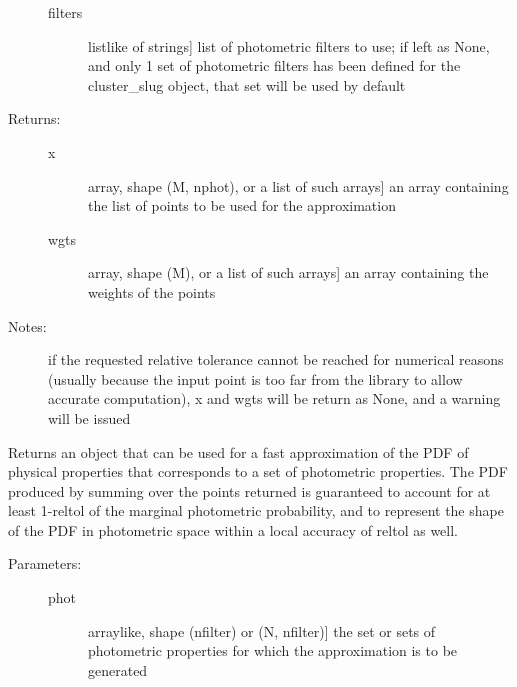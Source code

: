 \documentclass[letterpaper,10pt,english]{sphinxmanual}
\begin{document}
\begin{fulllineitems}
\begin{fulllineitems}
\begin{description}
\begin{description}
\item[{filters}] \leavevmode{[}listlike of strings{]}
list of photometric filters to use; if left as None, and
only 1 set of photometric filters has been defined for
the cluster\_slug object, that set will be used by
default

\end{description}

\item[{Returns:}] \leavevmode\begin{description}
\item[{x}] \leavevmode{[}array, shape (M, nphot), or a list of such arrays{]}
an array containing the list of points to be used for
the approximation

\item[{wgts}] \leavevmode{[}array, shape (M), or a list of such arrays{]}
an array containing the weights of the points

\end{description}

\item[{Notes:}] \leavevmode
if the requested relative tolerance cannot be reached for
numerical reasons (usually because the input point is too
far from the library to allow accurate computation), x and
wgts will be return as None, and a warning will be issued

\end{description}

\end{fulllineitems}


\begin{fulllineitems}
\label{\detokenize{cluster_slug:slugpy.cluster_slug.cluster_slug.make_approx_phys}}
Returns an object that can be used for a fast approximation of
the PDF of physical properties that corresponds to a set of
photometric properties. The PDF produced by summing over the
points returned is guaranteed to account for at least 1-reltol
of the marginal photometric probability, and to represent the
shape of the PDF in photometric space within a local accuracy
of reltol as well.
\begin{description}
\item[{Parameters:}] \leavevmode\begin{description}
\item[{phot}] \leavevmode{[}arraylike, shape (nfilter) or (N, nfilter){]}
the set or sets of photometric properties for which the
approximation is to be generated


\end{description}
\end{description}
\end{fulllineitems}
\end{fulllineitems}
\end{document}
